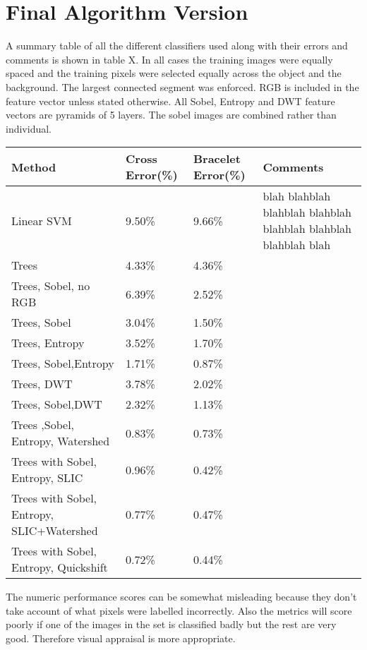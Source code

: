 \documentclass[12pt]{IIBproject}
\begin{document}
\section{Final Algorithm Version}
A summary table of all the different classifiers used along with their errors and comments is shown in table X. In all cases the training images were equally spaced and the training pixels were selected equally across the object and the background. The largest connected segment was enforced. RGB is included in the feature vector unless stated otherwise. All Sobel, Entropy and DWT feature vectors are pyramids of 5 layers. The sobel images are combined rather than individual.
\begin{center}
    \begin{tabular}{ | p{5cm} | l | l | p{5cm} |}
    \hline
    Method & Cross Error(\%) & Bracelet Error(\%) & Comments \\ \hline
    Linear SVM & 9.50\% & 9.66\% & blah blahblah blahblah blahblah blahblah blahblah blahblah blah\\ \hline
    Trees & 4.33\% & 4.36\% \\ \hline
    Trees, Sobel, no RGB & 6.39\% & 2.52\% \\ \hline
    Trees, Sobel & 3.04\% & 1.50\% \\ \hline
    Trees, Entropy & 3.52\% & 1.70\% \\ \hline
    Trees, Sobel,Entropy & 1.71\% & 0.87\% \\
    \hline
    Trees, DWT  & 3.78\% & 2.02\% \\
    \hline
    Trees, Sobel,DWT & 2.32\% & 1.13\% \\
    \hline
    Trees ,Sobel, Entropy, Watershed & 0.83\% & 0.73\% \\
    \hline
    Trees with Sobel, Entropy, SLIC & 0.96\% & 0.42\% \\
    \hline
    Trees with Sobel, Entropy, SLIC+Watershed & 0.77\% & 0.47\% \\
    \hline
     Trees with Sobel, Entropy, Quickshift & 0.72\% & 0.44\% \\
    \hline
     
    \end{tabular}
    
\end{center}

The numeric performance scores can be somewhat misleading because they don't take account of what pixels were labelled incorrectly. Also the metrics will score poorly if one of the images in the set is classified badly but the rest are very good. Therefore visual appraisal is more appropriate.
\end{document}
